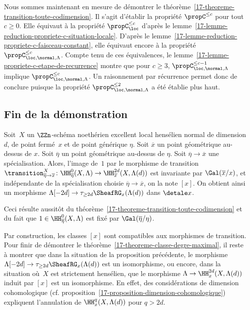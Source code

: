 \documentclass[10pt]{../fichiers-configuration-latex/smfart}
\begin{document}
\bigskip

Nous sommes maintenant en mesure de démontrer le
théorème~\ref{17-theoreme-transition-toute-codimension}. Il s'agit d'établir
la propriété $\propC^{\leq c}$ pour tout $c\geq 0$. Elle équivaut à la
propriété $\propC^{\leq c}_{\loc}$ d'après le
lemme~\ref{17-lemme-reduction-propriete-c-situation-locale}. D'après le
lemme~\ref{17-lemme-reduction-propriete-c-faisceau-constant}, elle équivaut
encore à la propriété 
$\propC^{\leq c}_{\loc,\normal,\Lambda}$. Compte tenu de ces
équivalences, le
lemme~\ref{17-lemme-propriete-c-etape-de-recurrence} montre que pour $c\geq
3$, $\propC^{\leq c-1}_{\loc,\normal,\Lambda}$ implique 
$\propC^{\leq c}_{\loc,\normal,\Lambda}$. Un raisonnement par récurrence
permet donc de conclure puisque la propriété $\propC^{\leq
2}_{\loc,\normal,\Lambda}$ a été établie plus haut.

\subsection{Fin de la démonstration}%

\begin{proposition2}
Soit $X$ un $\ZZn$-schéma noethérien excellent 
local hensélien normal de dimension $d$, de point fermé $x$ et
de point générique $\eta$. Soit $\overline x$ un point géométrique
au-dessus de $x$. Soit $\overline \eta$ un point géométrique au-dessus de
$\eta$. Soit $\overline\eta\to\overline x$ une spécialisation.
Alors, l'image de $1$ par le morphisme de transition
$\transition^X_{\overline\eta \to \overline x}\colon
\HH^0_{\overline \eta}(X,\Lambda)\to \HH^{2d}_{\overline x}(X,\Lambda(d))$ est
invariante par $\Gal(\overline x/x)$, et indépendante de la spécialisation
choisie $\overline \eta\to \overline x$, on la note $[x]$.
On obtient ainsi un morphisme
$\Lambda[-2d]\to \tau_{\geq 2d}\SheafRG_x(\Lambda(d))$
dans $\detale x$.
\end{proposition2}

Ceci résulte aussitôt du
théorème~\ref{17-theoreme-transition-toute-codimension} et du fait que $1\in
\HH^0_{\overline\eta}(X,\Lambda)$ est fixé par $\Gal(\overline\eta/\eta)$.

\bigskip

Par construction, les classes $[x]$ sont compatibles aux morphismes de
transition. Pour finir de démontrer le
théorème~\ref{17-theoreme-classe-degre-maximal}, il reste à montrer que dans
la situation de la proposition précédente, le morphisme $\Lambda[-2d]\to
\tau_{\geq 2d}\SheafRG_x(\Lambda(d))$ est un isomorphisme, ou
encore, dans la situation où $X$ est strictement hensélien, que le
morphisme $\Lambda\to \HH^{2d}_x(X,\Lambda(d))$ induit par $[x]$ est un
isomorphisme. En effet, des considérations de dimension cohomologique (cf.
proposition~\ref{17-proposition-dimension-cohomologique}) expliquent
l'annulation de $\HH^q_x(X,\Lambda(d))$ pour $q>2d$.
\end{document}
